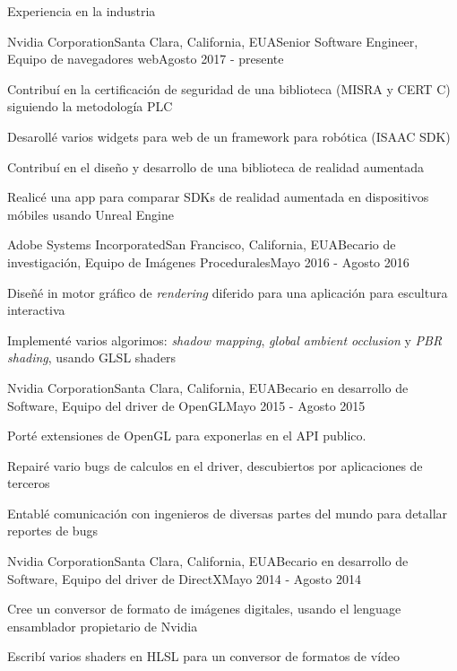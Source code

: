 \documentclass{resume} %
\begin{document}

\begin{rSection}{Experiencia en la industria}

\begin{rSubsection}{Nvidia Corporation}{Santa Clara, California, EUA}{Senior Software Engineer, Equipo de navegadores web}{Agosto 2017 - presente}
\item Contribuí en la certificación de seguridad de una biblioteca (MISRA y CERT C) siguiendo la metodología PLC
\item Desarollé varios widgets para web de un framework para robótica (ISAAC SDK)
\item Contribuí en el diseño y desarrollo de una biblioteca de realidad aumentada
\item Realicé una app para comparar SDKs de realidad aumentada en dispositivos móbiles usando Unreal Engine
\end{rSubsection}

\begin{rSubsection}{Adobe Systems Incorporated}{San Francisco, California, EUA}{Becario de investigación, Equipo de Imágenes Procedurales}{Mayo 2016 - Agosto 2016}
\item Diseñé in motor gráfico de \emph{rendering} diferido para una aplicación para escultura interactiva
\item Implementé varios algorimos: \emph{shadow mapping}, \emph{global ambient occlusion} y \emph{PBR shading}, usando GLSL shaders
\end{rSubsection}

\begin{rSubsection}{Nvidia Corporation}{Santa Clara, California, EUA}{Becario en desarrollo de Software, Equipo del driver de OpenGL}{Mayo 2015 - Agosto 2015}
\item Porté extensiones de OpenGL para exponerlas en el API publico.
\item Repairé vario bugs de calculos en el driver, descubiertos por aplicaciones de terceros
\item Entablé comunicación con ingenieros de diversas partes del mundo para detallar reportes de bugs
\end{rSubsection}

\begin{rSubsection}{Nvidia Corporation}{Santa Clara, California, EUA}{Becario en desarrollo de Software, Equipo del driver de DirectX}{Mayo 2014 - Agosto 2014}
\item Cree un conversor de formato de imágenes digitales, usando el lenguage ensamblador propietario de Nvidia
\item Escribí varios shaders en HLSL para un conversor de formatos de vídeo
\end{rSubsection}


\end{rSection}
\end{document}
